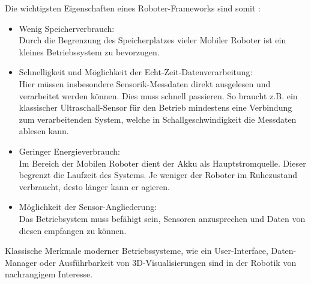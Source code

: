 \documentclass[twoside,11pt, a4paper]{report}
\begin{document}
	Die wichtigsten Eigenschaften eines Roboter-Frameworks sind somit :
	\begin{itemize}
		\item Wenig Speicherverbrauch:\\
		Durch die Begrenzung des Speicherplatzes vieler Mobiler Roboter ist ein kleines Betriebssystem zu bevorzugen. 
		\item Schnelligkeit und Möglichkeit der Echt-Zeit-Datenverarbeitung: \\
		Hier müssen insbesondere Sensorik-Messdaten direkt ausgelesen und verarbeitet werden können. Dies muss schnell passieren. So braucht z.B. ein klassischer Ultraschall-Sensor für den Betrieb mindestens eine Verbindung zum verarbeitenden System, welche in Schallgeschwindigkeit die Messdaten ablesen kann. 
		\item Geringer Energieverbrauch:\\
		Im Bereich der Mobilen Roboter dient der Akku als Hauptstromquelle. Dieser begrenzt die Laufzeit des Systems. Je weniger der Roboter im Ruhezustand verbraucht, desto länger kann er agieren. 
		\item Möglichkeit der Sensor-Angliederung:\\
		Das Betriebsystem muss befähigt sein, Sensoren anzusprechen und Daten von diesen empfangen zu können.
	\end{itemize}
	
	Klassische Merkmale moderner Betriebssysteme, wie ein User-Interface, Daten-Manager oder Ausführbarkeit von 3D-Visualisierungen sind in der Robotik von nachrangigem Interesse. 
	
\end{document}
